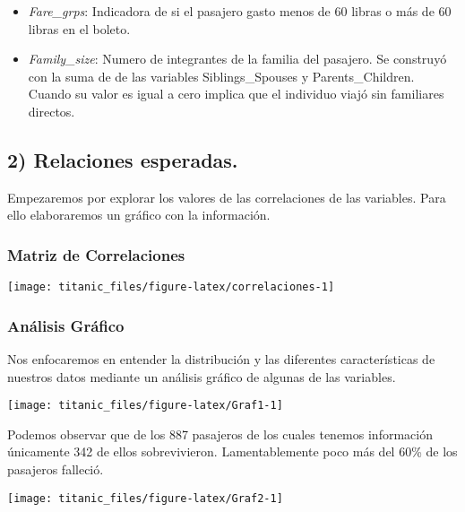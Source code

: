 \documentclass[
]{article}
\begin{document}
\begin{itemize}
\item
  \emph{Fare\_grps}: Indicadora de si el pasajero gasto menos de 60
  libras o más de 60 libras en el boleto.
\item
  \emph{Family\_size}: Numero de integrantes de la familia del pasajero.
  Se construyó con la suma de de las variables Siblings\_Spouses y
  Parents\_Children. Cuando su valor es igual a cero implica que el
  individuo viajó sin familiares directos.
\end{itemize}

\hypertarget{relaciones-esperadas.}{%
\subsection{2) Relaciones esperadas.}\label{relaciones-esperadas.}}

Empezaremos por explorar los valores de las correlaciones de las
variables. Para ello elaboraremos un gráfico con la información.

\hypertarget{matriz-de-correlaciones}{%
\subsubsection{Matriz de Correlaciones}\label{matriz-de-correlaciones}}

\begin{center}\texttt{[image: titanic\_files/figure-latex/correlaciones-1]} \end{center}

\hypertarget{anuxe1lisis-gruxe1fico}{%
\subsubsection{Análisis Gráfico}\label{anuxe1lisis-gruxe1fico}}

Nos enfocaremos en entender la distribución y las diferentes
características de nuestros datos mediante un análisis gráfico de
algunas de las variables.

\begin{center}\texttt{[image: titanic\_files/figure-latex/Graf1-1]} \end{center}

Podemos observar que de los 887 pasajeros de los cuales tenemos
información únicamente 342 de ellos sobrevivieron. Lamentablemente poco
más del 60\% de los pasajeros falleció.

\begin{center}\texttt{[image: titanic\_files/figure-latex/Graf2-1]} \end{center}
\end{document}
